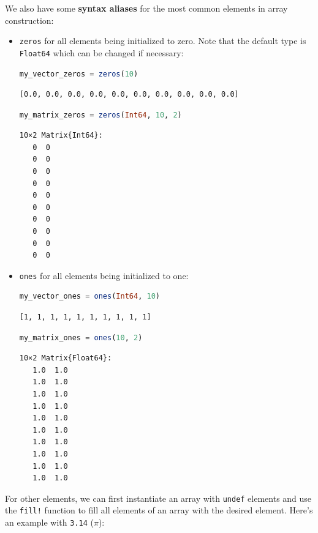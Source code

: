 \documentclass[
  notoc %
]{tufte-book}
\newcommand{\passthrough}[1]{#1}
\begin{document}
We also have some \textbf{syntax aliases} for the most common elements
in array construction:

\begin{itemize}
\item
  \passthrough{\lstinline!zeros!} for all elements being initialized to
  zero. Note that the default type is \passthrough{\lstinline!Float64!}
  which can be changed if necessary:

  \begin{lstlisting}[language=Julia]
  my_vector_zeros = zeros(10)
  \end{lstlisting}

  \begin{lstlisting}[language=Output]
  [0.0, 0.0, 0.0, 0.0, 0.0, 0.0, 0.0, 0.0, 0.0, 0.0]
  \end{lstlisting}

  \begin{lstlisting}[language=Julia]
  my_matrix_zeros = zeros(Int64, 10, 2)
  \end{lstlisting}

  \begin{lstlisting}[language=Output]
  10×2 Matrix{Int64}:
   0  0
   0  0
   0  0
   0  0
   0  0
   0  0
   0  0
   0  0
   0  0
   0  0
  \end{lstlisting}
\item
  \passthrough{\lstinline!ones!} for all elements being initialized to
  one:

  \begin{lstlisting}[language=Julia]
  my_vector_ones = ones(Int64, 10)
  \end{lstlisting}

  \begin{lstlisting}[language=Output]
  [1, 1, 1, 1, 1, 1, 1, 1, 1, 1]
  \end{lstlisting}

  \begin{lstlisting}[language=Julia]
  my_matrix_ones = ones(10, 2)
  \end{lstlisting}

  \begin{lstlisting}[language=Output]
  10×2 Matrix{Float64}:
   1.0  1.0
   1.0  1.0
   1.0  1.0
   1.0  1.0
   1.0  1.0
   1.0  1.0
   1.0  1.0
   1.0  1.0
   1.0  1.0
   1.0  1.0
  \end{lstlisting}
\end{itemize}

For other elements, we can first instantiate an array with
\passthrough{\lstinline!undef!} elements and use the
\passthrough{\lstinline"fill!"} function to fill all elements of an
array with the desired element. Here's an example with
\passthrough{\lstinline!3.14!} (\(\pi\)):
\end{document}
